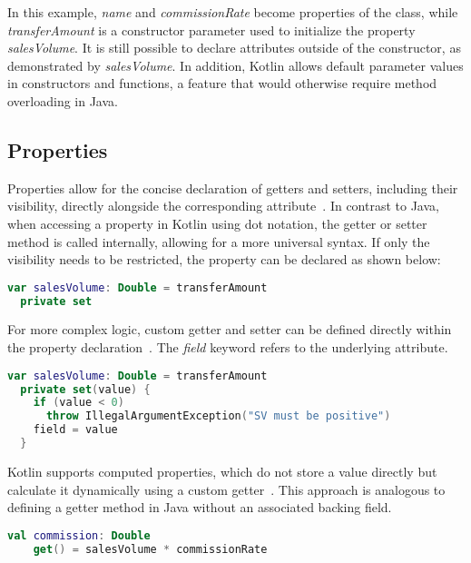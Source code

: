 \documentclass[a4paper, 11pt]{article}
\begin{document}
In this example, \textit{name} and \textit{commissionRate} become properties of the class, while \textit{transferAmount} is a constructor parameter used to initialize the property \textit{salesVolume}. It is still possible to declare attributes outside of the constructor, as demonstrated by \textit{salesVolume}. 
In addition, Kotlin allows default parameter values in constructors and functions, a feature that would otherwise require method overloading in Java.

\subsection{Properties}
Properties allow for the concise declaration of getters and setters, including their visibility, directly alongside the corresponding attribute~\cite{declaring-properties,properties-getters-setters}.
In contrast to Java, when accessing a property in Kotlin using dot notation, the getter or setter method is called internally, allowing for a more universal syntax.
If only the visibility needs to be restricted, the property can be declared as shown below:

\begin{lstlisting}[language=Kotlin,title={Private setter}]
var salesVolume: Double = transferAmount
  private set
\end{lstlisting}

For more complex logic, custom getter and setter can be defined directly within the property declaration~\cite{properties-getters-setters}. 
The \textit{field} keyword refers to the underlying attribute. 

\begin{lstlisting}[language=Kotlin,title={Custom accessors}]
var salesVolume: Double = transferAmount
  private set(value) {
    if (value < 0)
      throw IllegalArgumentException("SV must be positive")
    field = value
  }
\end{lstlisting}

Kotlin supports computed properties, which do not store a value directly but calculate it dynamically using a custom getter~\cite{properties-getters-setters}. 
This approach is analogous to defining a getter method in Java without an associated backing field.

\begin{lstlisting}[language=Kotlin,title={Computed Property}]
  val commission: Double
    get() = salesVolume * commissionRate
\end{lstlisting}
\end{document}
